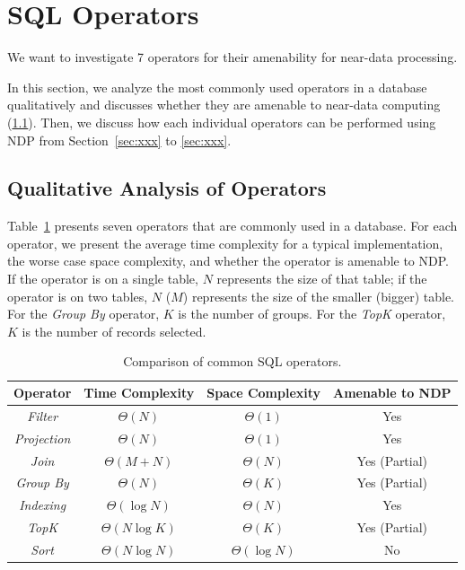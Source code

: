 \documentclass{article}
\newcommand{\filter}{\textit{Filter}\xspace}
\newcommand{\projection}{\textit{Projection}\xspace}
\newcommand{\join}{\textit{Join}\xspace}
\newcommand{\sort}{\textit{Sort}\xspace}
\newcommand{\indexing}{\textit{Indexing}\xspace}
\newcommand{\groupby}{\textit{Group By}\xspace}
\newcommand{\topk}{\textit{TopK}\xspace}
\begin{document}
\section{SQL Operators}

We want to investigate 7 operators for their amenability for near-data processing.

In this section, we analyze the most commonly used operators in a database qualitatively and discusses whether they are amenable to near-data computing (\cref{sec:analysis}). Then, we discuss how each individual operators can be performed using NDP from Section~\ref{sec:xxx} to \ref{sec:xxx}. 

\subsection{Qualitative Analysis of Operators} \label{sec:analysis}

Table~\ref{tab:operators} presents seven operators that are commonly used in a database. For each operator, we present the average time complexity for a typical implementation, the worse case space complexity, and whether the operator is amenable to NDP. If the operator is on a single table, $N$ represents the size of that table; if the operator is on two tables, $N$ ($M$) represents the size of the smaller (bigger) table. For the \textit{Group By} operator, $K$ is the number of groups. For the \textit{TopK} operator, $K$ is the number of records selected. 

\begin{table}
\centering 
\begin{tabular}{ |c|c|c|c| } 
 \hline
 Operator       & Time Complexity & Space Complexity  & Amenable to NDP \\ \hline
 \filter        & $\Theta(N)$     & $\Theta(1)$       & Yes             \\ \hline
 \projection    & $\Theta(N)$     & $\Theta(1)$       & Yes             \\ \hline
 \join          & $\Theta(M + N)$ & $\Theta(N)$       & Yes (Partial)   \\ \hline
 \groupby       & $\Theta(N)$     & $\Theta(K)$       & Yes (Partial)   \\ \hline
 \indexing      & $\Theta(\log{N})$ & $\Theta(N)$     & Yes             \\ \hline
 \topk          & $\Theta(N\log{K})$ & $\Theta(K)$    & Yes (Partial)   \\ \hline
 \sort          & $\Theta(N\log{N})$ & $\Theta(\log{N})$ & No           \\ \hline
\end{tabular}
\caption{Comparison of common SQL operators.}
\label{tab:operators}
\end{table}
\end{document}
